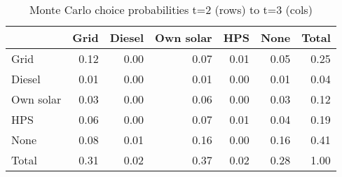 \begin{table}[!ht]
	\centering
		\caption{Monte Carlo choice probabilities t=2 (rows) to t=3 (cols)}
\begin{tabular}{lrrrrrr}
		\toprule
               &      Grid&    Diesel& Own solar&       HPS&      None&     Total\\
		\midrule
		           Grid&      0.12&      0.00&      0.07&      0.01&      0.05&      0.25\\
		         Diesel&      0.01&      0.00&      0.01&      0.00&      0.01&      0.04\\
		      Own solar&      0.03&      0.00&      0.06&      0.00&      0.03&      0.12\\
		            HPS&      0.06&      0.00&      0.07&      0.01&      0.04&      0.19\\
		           None&      0.08&      0.01&      0.16&      0.00&      0.16&      0.41\\
		          Total&      0.31&      0.02&      0.37&      0.02&      0.28&      1.00\\
		\bottomrule
	\end{tabular}
\end{table}
